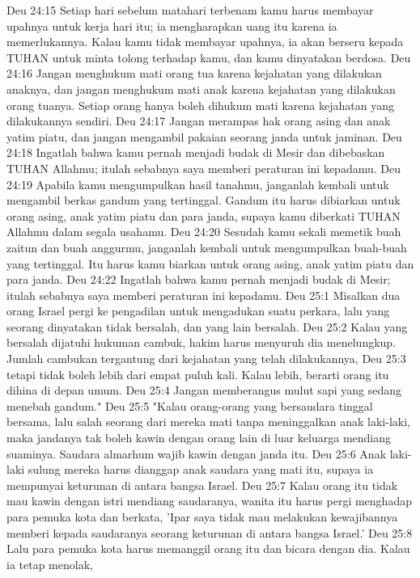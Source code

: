 Deu 24:15  Setiap hari sebelum matahari terbenam kamu harus membayar upahnya untuk kerja hari itu; ia mengharapkan uang itu karena ia memerlukannya. Kalau kamu tidak membayar upahnya, ia akan berseru kepada TUHAN untuk minta tolong terhadap kamu, dan kamu dinyatakan berdosa.
Deu 24:16  Jangan menghukum mati orang tua karena kejahatan yang dilakukan anaknya, dan jangan menghukum mati anak karena kejahatan yang dilakukan orang tuanya. Setiap orang hanya boleh dihukum mati karena kejahatan yang dilakukannya sendiri.
Deu 24:17  Jangan merampas hak orang asing dan anak yatim piatu, dan jangan mengambil pakaian seorang janda untuk jaminan.
Deu 24:18  Ingatlah bahwa kamu pernah menjadi budak di Mesir dan dibebaskan TUHAN Allahmu; itulah sebabnya saya memberi peraturan ini kepadamu.
Deu 24:19  Apabila kamu mengumpulkan hasil tanahmu, janganlah kembali untuk mengambil berkas gandum yang tertinggal. Gandum itu harus dibiarkan untuk orang asing, anak yatim piatu dan para janda, supaya kamu diberkati TUHAN Allahmu dalam segala usahamu.
Deu 24:20  Sesudah kamu sekali memetik buah zaitun dan buah anggurmu, janganlah kembali untuk mengumpulkan buah-buah yang tertinggal. Itu harus kamu biarkan untuk orang asing, anak yatim piatu dan para janda.
Deu 24:22  Ingatlah bahwa kamu pernah menjadi budak di Mesir; itulah sebabnya saya memberi peraturan ini kepadamu.
Deu 25:1  Misalkan dua orang Israel pergi ke pengadilan untuk mengadukan suatu perkara, lalu yang seorang dinyatakan tidak bersalah, dan yang lain bersalah.
Deu 25:2  Kalau yang bersalah dijatuhi hukuman cambuk, hakim harus menyuruh dia menelungkup. Jumlah cambukan tergantung dari kejahatan yang telah dilakukannya,
Deu 25:3  tetapi tidak boleh lebih dari empat puluh kali. Kalau lebih, berarti orang itu dihina di depan umum.
Deu 25:4  Jangan memberangus mulut sapi yang sedang menebah gandum."
Deu 25:5  "Kalau orang-orang yang bersaudara tinggal bersama, lalu salah seorang dari mereka mati tanpa meninggalkan anak laki-laki, maka jandanya tak boleh kawin dengan orang lain di luar keluarga mendiang suaminya. Saudara almarhum wajib kawin dengan janda itu.
Deu 25:6  Anak laki-laki sulung mereka harus dianggap anak saudara yang mati itu, supaya ia mempunyai keturunan di antara bangsa Israel.
Deu 25:7  Kalau orang itu tidak mau kawin dengan istri mendiang saudaranya, wanita itu harus pergi menghadap para pemuka kota dan berkata, 'Ipar saya tidak mau melakukan kewajibannya memberi kepada saudaranya seorang keturunan di antara bangsa Israel.'
Deu 25:8  Lalu para pemuka kota harus memanggil orang itu dan bicara dengan dia. Kalau ia tetap menolak,
